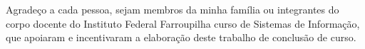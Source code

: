 \begin{agradecimentos}
Agradeço a cada pessoa, sejam membros da minha família ou integrantes do corpo docente do Instituto Federal Farroupilha curso de Sistemas de Informação, que apoiaram e incentivaram a elaboração deste trabalho de conclusão de curso.
\end{agradecimentos}